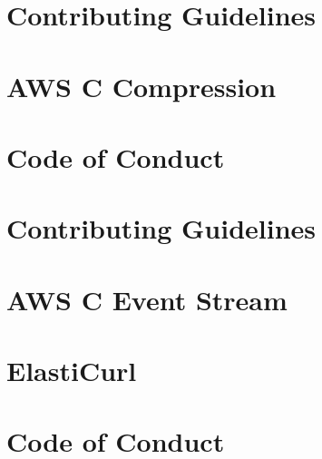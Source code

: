 \documentclass[twoside]{book}
\newcommand{\+}{\discretionary{\mbox{\scriptsize$\hookleftarrow$}}{}{}}
\begin{document}
\chapter{Contributing Guidelines}
\label{md_crt_aws_crt_cpp_crt_aws_c_compression__c_o_n_t_r_i_b_u_t_i_n_g}

\chapter{AWS C Compression}
\label{md_crt_aws_crt_cpp_crt_aws_c_compression__r_e_a_d_m_e}

\chapter{Code of Conduct}
\label{md_crt_aws_crt_cpp_crt_aws_c_event_stream__c_o_d_e__o_f__c_o_n_d_u_c_t}

\chapter{Contributing Guidelines}
\label{md_crt_aws_crt_cpp_crt_aws_c_event_stream__c_o_n_t_r_i_b_u_t_i_n_g}

\chapter{AWS C Event Stream}
\label{md_crt_aws_crt_cpp_crt_aws_c_event_stream__r_e_a_d_m_e}

\chapter{Elasti\+Curl}
\label{md_crt_aws_crt_cpp_crt_aws_c_http_bin_elasticurl__r_e_a_d_m_e}

\chapter{Code of Conduct}
\label{md_crt_aws_crt_cpp_crt_aws_c_http__c_o_d_e__o_f__c_o_n_d_u_c_t}

\end{document}
